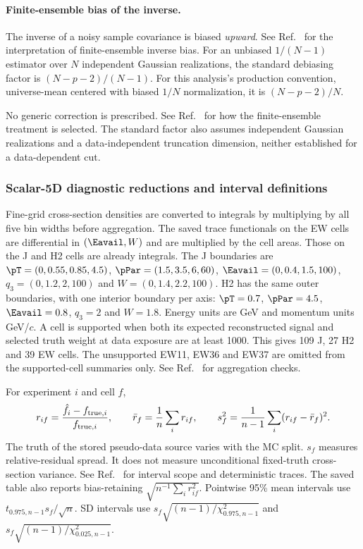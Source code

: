 \paragraph{Finite-ensemble bias of the inverse.} The inverse of a noisy sample covariance is biased \emph{upward}. See Ref.~\cite{NoteRecords2026} for the interpretation of finite-ensemble inverse bias. For an unbiased $1/(N-1)$ estimator over $N$ independent Gaussian realizations, the standard debiasing factor is $(N-p-2)/(N-1)$. For this analysis's production convention, universe-mean centered with biased $1/N$ normalization, it is $(N-p-2)/N$.

No generic correction is prescribed. See Ref.~\cite{NoteRecords2026} for how the finite-ensemble treatment is selected. The standard factor also assumes independent Gaussian realizations and a data-independent truncation dimension, neither established for a data-dependent cut.

\subsubsection{Scalar-5D diagnostic reductions and interval definitions}
\label{sec:gbdt-diagnostic-definitions}

Fine-grid cross-section densities are converted to integrals by multiplying by all five bin widths before aggregation. The saved trace functionals on the EW cells are differential in $(\Eavail,W)$ and are multiplied by the cell areas. Those on the J and H2 cells are already integrals. The J boundaries are $\pT=(0,0.55,0.85,4.5)$, $\pPar=(1.5,3.5,6,60)$, $\Eavail=(0,0.4,1.5,100)$, $q_3=(0,1.2,2,100)$ and $W=(0,1.4,2.2,100)$. H2 has the same outer boundaries, with one interior boundary per axis: $\pT=0.7$, $\pPar=4.5$, $\Eavail=0.8$, $q_3=2$ and $W=1.8$. Energy units are GeV and momentum units GeV/$c$. A cell is supported when both its expected reconstructed signal and selected truth weight at data exposure are at least 1000. This gives 109 J, 27 H2 and 39 EW cells. The unsupported EW11, EW36 and EW37 are omitted from the supported-cell summaries only. See Ref.~\cite{NoteRecords2026} for aggregation checks.

For experiment $i$ and cell $f$,
\begin{equation}
 r_{if}=\frac{\hat f_i-f_{{\rm true},i}}{f_{{\rm true},i}},\qquad
 \bar r_f=\frac1n\sum_i r_{if},\qquad
 s_f^2=\frac1{n-1}\sum_i(r_{if}-\bar r_f)^2.
\end{equation}
The truth of the stored pseudo-data source varies with the MC split. $s_f$ measures relative-residual spread. It does not measure unconditional fixed-truth cross-section variance. See Ref.~\cite{NoteRecords2026} for interval scope and deterministic traces. The saved table also reports bias-retaining $\sqrt{n^{-1}\sum_i r_{if}^2}$. Pointwise 95\% mean intervals use $t_{0.975,n-1}s_f/\sqrt n$. SD intervals use $s_f\sqrt{(n-1)/\chi^2_{0.975,n-1}}$ and $s_f\sqrt{(n-1)/\chi^2_{0.025,n-1}}$.

